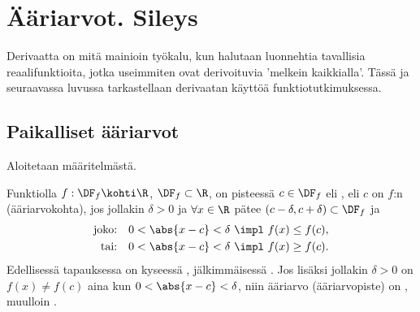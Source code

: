 \section{Ääriarvot. Sileys} \label{ääriarvot}
\alku

Derivaatta on mitä mainioin työkalu, kun halutaan luonnehtia tavallisia reaalifunktioita,
jotka useimmiten ovat derivoituvia 'melkein kaikkialla'. Tässä ja seuraavassa luvussa
tarkastellaan derivaatan käyttöä funktiotutkimuksessa.

\subsection{Paikalliset ääriarvot}

Aloitetaan määritelmästä.
\begin{Def} \label{paikallinen ääriarvo}
Funktiolla $f:\DF_f\kohti\R$, $\DF_f\subset\R$, on pisteessä $c\in\DF_f$  eli
, eli $c$ on $f$:n  
(ääri\-arvokohta), jos jollakin $\delta>0$ ja $\forall x\in\R$ pätee
$(c-\delta,c+\delta)\subset\DF_f$ ja
\begin{align*}
\text{joko:}\quad 0<\abs{x-c}<\delta \ &\impl \ f(x) \le f(c), \\
 \text{tai:}\quad 0<\abs{x-c}<\delta \ &\impl \ f(x) \ge f(c).
\end{align*}
Edellisessä tapauksessa on kyseessä , jälkimmäisessä 
. Jos lisäksi jollakin $\delta>0$ on $f(x) \neq f(c)$ aina
kun $0<\abs{x-c}<\delta$, niin ääriarvo (ääriarvopiste) on , muulloin
.
\end{Def}
